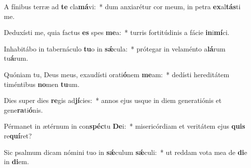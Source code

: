\item A fínibus terræ ad \textbf{te} cla\textbf{má}vi:~* dum anxiarétur cor meum, in petra \textbf{ex}al\textbf{tás}ti me.
\item Deduxísti me, quia factus \textbf{es} spes \textbf{me}a:~* turris fortitúdinis a fácie \textbf{in}i\textbf{mí}ci.
\item Inhabitábo in tabernáculo \textbf{tu}o in \textbf{sǽ}cula:~* prótegar in velaménto a\textbf{lá}rum tu\textbf{á}rum.
\item Quóniam tu, Deus meus, exaudísti orati\textbf{ó}nem \textbf{me}am:~* dedísti hereditátem timéntibus \textbf{no}men \textbf{tu}um.
\item Dies super dies \textbf{re}gis ad\textbf{jí}cies:~* annos ejus usque in diem generatiónis et gene\textbf{ra}ti\textbf{ó}nis.
\item Pérmanet in ætérnum in con\textbf{spéc}tu \textbf{De}i:~* misericórdiam et veritátem ejus \textbf{quis} re\textbf{quí}ret?
\item Sic psalmum dicam nómini tuo in \textbf{sǽ}culum \textbf{sǽ}culi:~* ut reddam vota mea de \textbf{di}e in \textbf{di}em.

